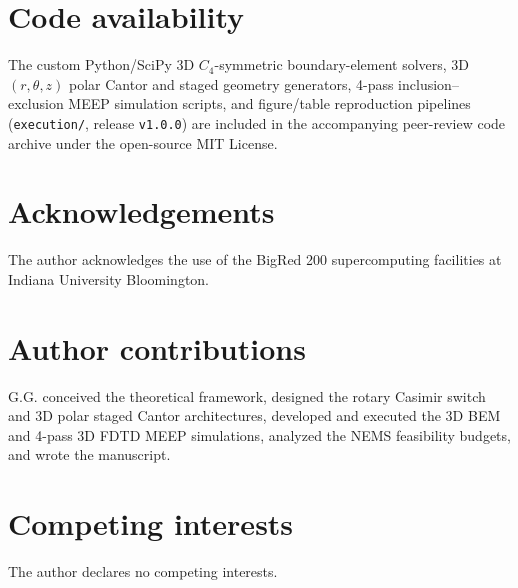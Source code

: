 \documentclass[pdflatex,sn-nature]{sn-jnl}
\begin{document}
\section*{Code availability}
The custom Python/SciPy 3D $C_4$-symmetric boundary-element solvers, 3D $(r,\theta,z)$ polar Cantor and staged geometry generators, 4-pass inclusion--exclusion MEEP simulation scripts, and figure/table reproduction pipelines (\texttt{execution/}, release \texttt{v1.0.0}) are included in the accompanying peer-review code archive under the open-source MIT License.

\section*{Acknowledgements}
The author acknowledges the use of the BigRed 200 supercomputing facilities at Indiana University Bloomington.

\section*{Author contributions}
G.G. conceived the theoretical framework, designed the rotary Casimir switch and 3D polar staged Cantor architectures, developed and executed the 3D BEM and 4-pass 3D FDTD MEEP simulations, analyzed the NEMS feasibility budgets, and wrote the manuscript.

\section*{Competing interests}
The author declares no competing interests.

% 


\clearpage
\renewcommand{\thefigure}{\arabic{figure}}
\renewcommand{\theHfigure}{ext.\arabic{figure}}
\renewcommand{\figurename}{Extended Data Fig.}
\setcounter{figure}{0}
\renewcommand{\thetable}{\arabic{table}}
\renewcommand{\theHtable}{ext.\arabic{table}}
\renewcommand{\tablename}{Extended Data Table}
\setcounter{table}{0}
\end{document}
